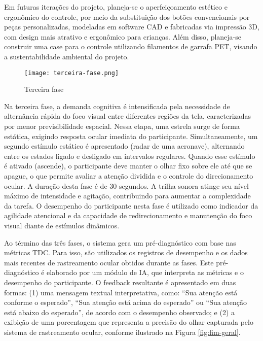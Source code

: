 Em futuras iterações do projeto, planeja-se o aperfeiçoamento estético e ergonômico do controle, por meio da substituição dos botões convencionais por peças personalizadas, modeladas em software CAD e fabricadas via impressão 3D, com design mais atrativo e ergonômico para crianças. Além disso, planeja-se construir uma case para o controle utilizando filamentos de garrafa PET, visando a sustentabilidade ambiental do projeto.

\begin{figure}[H]
    \centering
    \caption{Terceira fase}%
    \label{fig:terceira-fase}
    \texttt{[image: terceira-fase.png]}%
\end{figure}

Na terceira fase, a demanda cognitiva é intensificada pela necessidade de alternância rápida do foco visual entre diferentes regiões da tela, caracterizadas por menor previsibilidade espacial. Nessa etapa, uma estrela surge de forma estática, exigindo resposta ocular imediata do participante. Simultaneamente, um segundo estímulo estático é apresentado (radar de uma aeronave), alternando entre os estados ligado e desligado em intervalos regulares. Quando esse estímulo é ativado (ascende), o participante deve manter o olhar fixo sobre ele até que se apague, o que permite avaliar a atenção dividida e o controle do direcionamento ocular. A duração desta fase é de 30 segundos. A trilha sonora atinge seu nível máximo de intensidade e agitação, contribuindo para aumentar a complexidade da tarefa. O desempenho do participante nesta fase é utilizado como indicador da agilidade atencional e da capacidade de redirecionamento e manutenção do foco visual diante de estímulos dinâmicos.

Ao término das três fases, o sistema gera um pré-diagnóstico com base nas métricas TDC. Para isso, são utilizados os registros de desempenho e os dados mais recentes de rastreamento ocular obtidos durante as fases. Este pré-diagnóstico é elaborado por um módulo de IA, que interpreta as métricas e o desempenho do participante. O feedback resultante é apresentado em duas formas: (1) uma mensagem textual interpretativa, como: “Sua atenção está conforme o esperado”, “Sua atenção está acima do esperado” ou “Sua atenção está abaixo do esperado”, de acordo com o desempenho observado; e (2) a exibição de uma porcentagem que representa a precisão do olhar capturada pelo sistema de rastreamento ocular, conforme ilustrado na Figura \ref{fig:fim-geral}.

